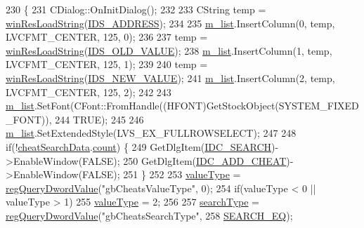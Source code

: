 \begin{DoxyCode}
230 \{
231   CDialog::OnInitDialog();
232 
233   CString temp = \mbox{\hyperlink{_win_res_util_8cpp_a416e85e80ab9b01376e87251c83d1a5a}{winResLoadString}}(\mbox{\hyperlink{resource_8h_a8c4c43573ba54b99f146c39eca3ef75d}{IDS\_ADDRESS}});
234 
235   \mbox{\hyperlink{class_g_b_cheat_search_a4385c178810aafb751e2bbc80a1a67c3}{m\_list}}.InsertColumn(0, temp, LVCFMT\_CENTER, 125, 0);
236 
237   temp = \mbox{\hyperlink{_win_res_util_8cpp_a416e85e80ab9b01376e87251c83d1a5a}{winResLoadString}}(\mbox{\hyperlink{resource_8h_af732ffa656c552ce5c9865bde1c8f45a}{IDS\_OLD\_VALUE}});
238   \mbox{\hyperlink{class_g_b_cheat_search_a4385c178810aafb751e2bbc80a1a67c3}{m\_list}}.InsertColumn(1, temp, LVCFMT\_CENTER, 125, 1);
239 
240   temp = \mbox{\hyperlink{_win_res_util_8cpp_a416e85e80ab9b01376e87251c83d1a5a}{winResLoadString}}(\mbox{\hyperlink{resource_8h_aa9cf1947b74bb2e7c2bd69d827145e75}{IDS\_NEW\_VALUE}});
241   \mbox{\hyperlink{class_g_b_cheat_search_a4385c178810aafb751e2bbc80a1a67c3}{m\_list}}.InsertColumn(2, temp, LVCFMT\_CENTER, 125, 2);
242   
243   \mbox{\hyperlink{class_g_b_cheat_search_a4385c178810aafb751e2bbc80a1a67c3}{m\_list}}.SetFont(CFont::FromHandle((HFONT)GetStockObject(SYSTEM\_FIXED\_FONT)),
244                  TRUE);
245 
246   \mbox{\hyperlink{class_g_b_cheat_search_a4385c178810aafb751e2bbc80a1a67c3}{m\_list}}.SetExtendedStyle(LVS\_EX\_FULLROWSELECT);
247   
248   \textcolor{keywordflow}{if}(!\mbox{\hyperlink{_cheat_search_8cpp_aeeb4f5916a0f16b1bb45e57aa2cc58d4}{cheatSearchData}}.\mbox{\hyperlink{struct_cheat_search_data_a4c4d3092ddaff068d820c28067b15774}{count}}) \{
249     GetDlgItem(\mbox{\hyperlink{resource_8h_a8c4255e9c378282d679addf177c44b8f}{IDC\_SEARCH}})->EnableWindow(FALSE);
250     GetDlgItem(\mbox{\hyperlink{resource_8h_a37e53836b85277d7baf69ac54a0fd3e7}{IDC\_ADD\_CHEAT}})->EnableWindow(FALSE);
251   \}
252 
253   \mbox{\hyperlink{class_g_b_cheat_search_a86a4834163ee6a13a5bb8531a7c67c1d}{valueType}} = \mbox{\hyperlink{_reg_8cpp_a150640889ffff4851ee26d7b999ec7c3}{regQueryDwordValue}}(\textcolor{stringliteral}{"gbCheatsValueType"}, 0);
254   \textcolor{keywordflow}{if}(valueType < 0 || valueType > 1)
255     \mbox{\hyperlink{class_g_b_cheat_search_a86a4834163ee6a13a5bb8531a7c67c1d}{valueType}} = 2;
256   
257   \mbox{\hyperlink{class_g_b_cheat_search_a35d0a28509b050fcb3608d6f9777bda7}{searchType}} = \mbox{\hyperlink{_reg_8cpp_a150640889ffff4851ee26d7b999ec7c3}{regQueryDwordValue}}(\textcolor{stringliteral}{"gbCheatsSearchType"},
258                                   \mbox{\hyperlink{_cheat_search_8h_a06fc87d81c62e9abb8790b6e5713c55ba234250b8584bedf460dbd7ead0c30e5f}{SEARCH\_EQ}});

\end{DoxyCode}
